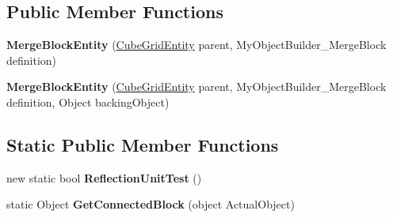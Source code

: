 \subsection*{Public Member Functions}
\begin{DoxyCompactItemize}
\item 
\hypertarget{class_s_e_mod_a_p_i_internal_1_1_a_p_i_1_1_entity_1_1_sector_1_1_sector_object_1_1_cube_grid_1_15c3f321f9502c29c7df9fbd0ea065d76_a2c7718207d0648496190cf8cb607dd68}{}{\bfseries Merge\+Block\+Entity} (\hyperlink{class_s_e_mod_a_p_i_internal_1_1_a_p_i_1_1_entity_1_1_sector_1_1_sector_object_1_1_cube_grid_entity}{Cube\+Grid\+Entity} parent, My\+Object\+Builder\+\_\+\+Merge\+Block definition)\label{class_s_e_mod_a_p_i_internal_1_1_a_p_i_1_1_entity_1_1_sector_1_1_sector_object_1_1_cube_grid_1_15c3f321f9502c29c7df9fbd0ea065d76_a2c7718207d0648496190cf8cb607dd68}

\item 
\hypertarget{class_s_e_mod_a_p_i_internal_1_1_a_p_i_1_1_entity_1_1_sector_1_1_sector_object_1_1_cube_grid_1_15c3f321f9502c29c7df9fbd0ea065d76_a19afb913bf6f5693fc1b7c9448fa097e}{}{\bfseries Merge\+Block\+Entity} (\hyperlink{class_s_e_mod_a_p_i_internal_1_1_a_p_i_1_1_entity_1_1_sector_1_1_sector_object_1_1_cube_grid_entity}{Cube\+Grid\+Entity} parent, My\+Object\+Builder\+\_\+\+Merge\+Block definition, Object backing\+Object)\label{class_s_e_mod_a_p_i_internal_1_1_a_p_i_1_1_entity_1_1_sector_1_1_sector_object_1_1_cube_grid_1_15c3f321f9502c29c7df9fbd0ea065d76_a19afb913bf6f5693fc1b7c9448fa097e}

\end{DoxyCompactItemize}
\subsection*{Static Public Member Functions}
\begin{DoxyCompactItemize}
\item 
\hypertarget{class_s_e_mod_a_p_i_internal_1_1_a_p_i_1_1_entity_1_1_sector_1_1_sector_object_1_1_cube_grid_1_15c3f321f9502c29c7df9fbd0ea065d76_a922c514474aa0fa3385c185ddd445aad}{}new static bool {\bfseries Reflection\+Unit\+Test} ()\label{class_s_e_mod_a_p_i_internal_1_1_a_p_i_1_1_entity_1_1_sector_1_1_sector_object_1_1_cube_grid_1_15c3f321f9502c29c7df9fbd0ea065d76_a922c514474aa0fa3385c185ddd445aad}

\item 
\hypertarget{class_s_e_mod_a_p_i_internal_1_1_a_p_i_1_1_entity_1_1_sector_1_1_sector_object_1_1_cube_grid_1_15c3f321f9502c29c7df9fbd0ea065d76_af3cdac0c885e2320fff893f1d4873fca}{}static Object {\bfseries Get\+Connected\+Block} (object Actual\+Object)\label{class_s_e_mod_a_p_i_internal_1_1_a_p_i_1_1_entity_1_1_sector_1_1_sector_object_1_1_cube_grid_1_15c3f321f9502c29c7df9fbd0ea065d76_af3cdac0c885e2320fff893f1d4873fca}

\end{DoxyCompactItemize}
